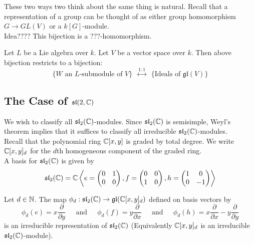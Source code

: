 \documentclass[a4paper]{article}
\begin{document}
These two ways two think about the same thing is natural. Recall that a representation of a group can be thought of as either group homomorphism $G\to GL(V)$ or a $k[G]$-module. \\

Idea???? This bijection is a ???-homomorphism. 

\begin{prp}{}{} Let $L$ be a Lie algebra over $k$. Let $V$ be a vector space over $k$. Then above bijection restricts to a bijection: $$\{W\text{ an }L\text{-submodule of }V\}\;\;\overset{1:1}{\leftrightarrow}\;\;\{\text{Ideals of }\mathfrak{gl}(V)\}$$
\end{prp}

\subsection{The Case of $\mathfrak{sl}(2,\mathbb{C})$}
We wish to classify all $\mathfrak{sl}_2(\mathbb{C})$-modules. Since $\mathfrak{sl}_2(\mathbb{C})$ is semisimple, Weyl's theorem implies that it suffices to classify all irreducible $\mathfrak{sl}_2(\mathbb{C})$-modules. \\

Recall that the polynomial ring $\mathbb{C}[x,y]$ is graded by total degree. We write $\mathbb{C}[x,y]_d$ for the $d$th homogeneous component of the graded ring. \\

A basis for $\mathfrak{sl}_2(\mathbb{C})$ is given by $$\mathfrak{sl}_2(\mathbb{C})=\mathbb{C}\left\langle e=\begin{pmatrix}
0 & 1\\0 & 0
\end{pmatrix}, f=\begin{pmatrix}
0 & 0\\1 & 0
\end{pmatrix}, h=\begin{pmatrix}
1 & 0\\0 & -1
\end{pmatrix}\right\rangle$$

\begin{prp}{}{} Let $d\in\mathbb{N}$. The map $\phi_d:\mathfrak{sl}_2(\mathbb{C})\to\mathfrak{gl}(\mathbb{C}[x,y]_d)$ defined on basis vectors by $$\phi_d(e)=x\frac{\partial}{\partial y}\;\;\;\;\text{ and }\;\;\;\;\phi_d(f)=y\frac{\partial}{\partial x}\;\;\;\;\text{ and }\;\;\;\;\phi_d(h)=x\frac{\partial}{\partial x}-y\frac{\partial}{\partial y}$$ is an irreducible representation of $\mathfrak{sl}_2(\mathbb{C})$ (Equivalently $\mathbb{C}[x,y]_d$ is an irreducible $\mathfrak{sl}_2(\mathbb{C})$-module). 
\end{prp}
\end{document}
